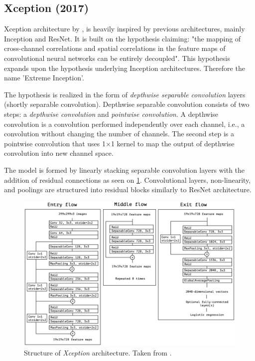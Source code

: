 \subsection{Xception (2017)}
\label{sec:xception} Xception architecture by \citeauthor{bib:xception} \cite{bib:xception}, is heavily inspired by previous architectures, mainly Inception and ResNet. It is built on the hypothesis claiming: "the mapping of cross-channel correlations and spatial correlations in the feature maps of convolutional neural networks can be entirely decoupled". This hypothesis expands upon the hypothesis underlying Inception architectures. Therefore the name 'Extreme Inception'. 

The hypothesis is realized in the form of \textit{depthwise separable convolution} layers (shortly separable convolution). Depthwise separable convolution consists of two steps: a \textit{depthwise convolution} and \textit{pointwise convolution}. A depthwise convolution is a convolution performed independently over each channel, i.e., a convolution without changing the number of channels. The second step is a pointwise convolution that uses 1$\times$1 kernel to map the output of depthwise convolution into new channel space.

The model is formed by linearly stacking separable convolution layers with the addition of residual connections as seen on \cref{fig:xception}. Convolutional layers, non-linearity, and poolings are structured into residual blocks similarly to ResNet architecture.

\begin{figure}
    \includegraphics[width=\textwidth]{img/xception}
    \caption[Xception architecture]%
    {Structure of \textit{Xception} architecture. Taken from \cite[fig. 5]{bib:xception}.}
    \label{fig:xception}
\end{figure}


